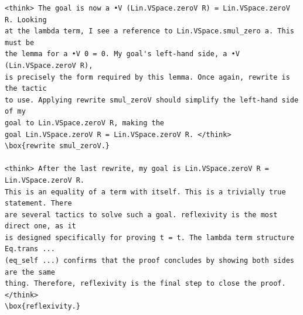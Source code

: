 \documentclass{article}
\begin{document}
\begin{verbatim}
<think> The goal is now a •V (Lin.VSpace.zeroV R) = Lin.VSpace.zeroV R. Looking
at the lambda term, I see a reference to Lin.VSpace.smul_zero a. This must be
the lemma for a •V 0 = 0. My goal's left-hand side, a •V (Lin.VSpace.zeroV R),
is precisely the form required by this lemma. Once again, rewrite is the tactic
to use. Applying rewrite smul_zeroV should simplify the left-hand side of my
goal to Lin.VSpace.zeroV R, making the
goal Lin.VSpace.zeroV R = Lin.VSpace.zeroV R. </think>
\box{rewrite smul_zeroV.}

<think> After the last rewrite, my goal is Lin.VSpace.zeroV R = Lin.VSpace.zeroV R.
This is an equality of a term with itself. This is a trivially true statement. There
are several tactics to solve such a goal. reflexivity is the most direct one, as it
is designed specifically for proving t = t. The lambda term structure Eq.trans ...
(eq_self ...) confirms that the proof concludes by showing both sides are the same
thing. Therefore, reflexivity is the final step to close the proof. </think>
\box{reflexivity.}
\end{verbatim}
\end{document}
